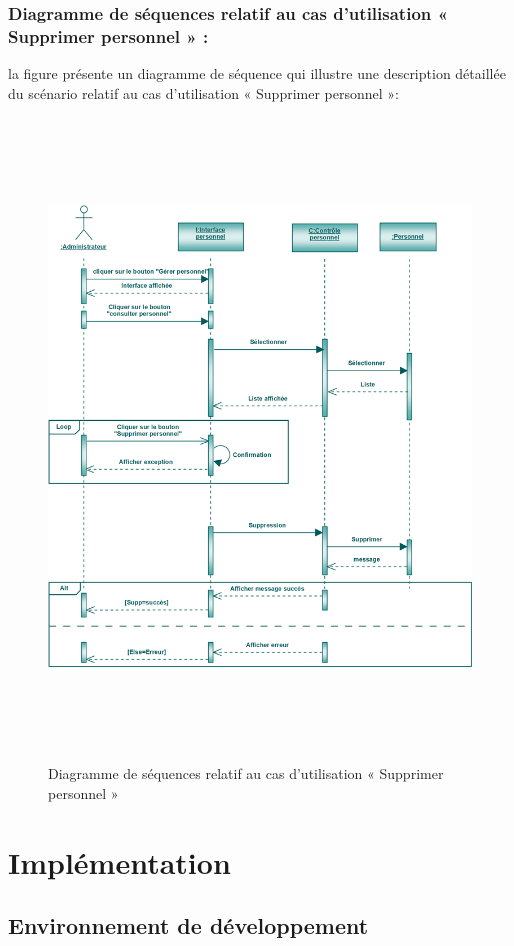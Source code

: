 \documentclass[12 pt]{report}
\begin{document}
\subsubsection{Diagramme de séquences relatif au cas d’utilisation « Supprimer personnel » :}
la figure   présente un diagramme de séquence qui illustre une description détaillée du scénario relatif au cas d’utilisation « Supprimer personnel »: 
{\begin{figure}[h]
 \begin{center}
\includegraphics[width= 18 cm ,height=  17cm]{sec_sup_per.PNG}
\caption{Diagramme de séquences relatif au cas d’utilisation « Supprimer personnel  »}

\end{center}
\end{figure}}
\newpage
\section{Implémentation}
\subsection{Environnement de développement}
\end{document}
